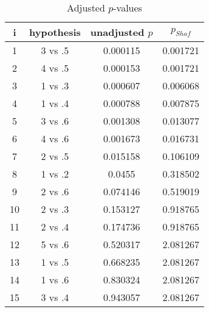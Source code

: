 \documentclass[a4paper,10pt]{article}
\begin{document}
\begin{landscape}
\begin{table}[!htp]
\centering\scriptsize
\begin{tabular}{cccc}
i&hypothesis&unadjusted $p$&$p_{Shaf}$\\
\hline1&3 vs .5&0.000115&0.001721\\
2&4 vs .5&0.000153&0.001721\\
3&1 vs .3&0.000607&0.006068\\
4&1 vs .4&0.000788&0.007875\\
5&3 vs .6&0.001308&0.013077\\
6&4 vs .6&0.001673&0.016731\\
7&2 vs .5&0.015158&0.106109\\
8&1 vs .2&0.0455&0.318502\\
9&2 vs .6&0.074146&0.519019\\
10&2 vs .3&0.153127&0.918765\\
11&2 vs .4&0.174736&0.918765\\
12&5 vs .6&0.520317&2.081267\\
13&1 vs .5&0.668235&2.081267\\
14&1 vs .6&0.830324&2.081267\\
15&3 vs .4&0.943057&2.081267\\
\hline
\end{tabular}
\caption{Adjusted $p$-values}
\end{table}

\end{landscape}
\end{document}
